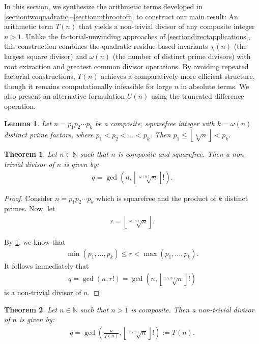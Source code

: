 \documentclass[10pt]{article}
\theoremstyle{plain}
\newtheorem{lemma}{Lemma}[section]
\newtheorem{theorem}{Theorem}[section]
\newcommand{\floor}[1]{\left\lfloor #1 \right\rfloor}
\begin{document}
In this section, we synthesize the arithmetic terms developed in \cref{sectiontwoquadratic}--\cref{sectionmthrootofn} to construct our main result: An arithmetic term $T(n)$ that yields a non-trivial divisor of any composite integer $n > 1$. Unlike the factorial-unwinding approaches of \cref{sectiondirectapplications}, this construction combines the quadratic residue-based invariants $\chi(n)$ (the largest square divisor) and $\omega(n)$ (the number of distinct prime divisors) with root extraction and greatest common divisor operations. By avoiding repeated factorial constructions, $T(n)$ achieves a comparatively more efficient structure, though it remains computationally infeasible for large $n$ in absolute terms. We also present an alternative formulation $U(n)$ using the truncated difference operation.

\begin{lemma} \label{proof:divisorrootbounds}
Let $n = p_1 p_2 \cdots p_k$ be a composite, squarefree integer with $k = \omega(n)$ distinct prime factors, where $p_1 < p_2 < \dots < p_k$. Then $p_1 \leq \floor{\sqrt[k]{n}} < p_k$.
\end{lemma}

\begin{theorem} \label{proof:sffactor}
Let $n \in \mathbb{N}$ such that $n$ is composite and squarefree. Then a non-trivial divisor of $n$ is given by:
\begin{align*}
q = \gcd(n, \floor{\sqrt[\omega(n)]{n}}!) .
\end{align*}
\end{theorem}
\begin{proof}
Consider $n = p_1 p_2 \cdots p_k$ which is squarefree and the product of $k$ distinct primes. Now, let
\begin{align*}
r = \floor{\sqrt[\omega(n)]{n}} .
\end{align*}

By \cref{proof:divisorrootbounds}, we know that
\begin{align*}
   \min(p_1,\ldots,p_k) \leq r < \max(p_1,\ldots,p_k) .
\end{align*}
It follows immediately that
\begin{align*}
q = \gcd(n, r!) = \gcd(n, \floor{\sqrt[\omega(n)]{n}}!)
\end{align*}
is a non-trivial divisor of $n$.
\end{proof}


\begin{theorem} \label{proof:divisor1}
Let $n \in \mathbb{N}$ such that $n>1$ is composite. Then a non-trivial divisor of $n$ is given by:
\begin{align*}
q = \gcd\left( \frac{n}{\chi(n)}, \floor{\sqrt[\omega(n)]{n}}! \right) :=T(n) .
\end{align*}
\end{theorem}
\end{document}
